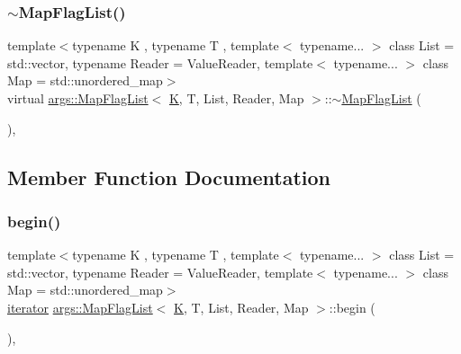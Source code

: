 \mbox{\label{classargs_1_1_map_flag_list_a8799bf86215d5a166efc57e1c8b512e2}} 
\subsubsection{\texorpdfstring{$\sim$\+Map\+Flag\+List()}{~MapFlagList()}}
{\footnotesize\ttfamily template$<$typename K , typename T , template$<$ typename... $>$ class List = std\+::vector, typename Reader  = Value\+Reader, template$<$ typename... $>$ class Map = std\+::unordered\+\_\+map$>$ \\
virtual \hyperlink{classargs_1_1_map_flag_list}{args\+::\+Map\+Flag\+List}$<$ \hyperlink{cgal__test_8cpp_a891e241aa245ae63618f03737efba309}{K}, T, List, Reader, Map $>$\+::$\sim$\hyperlink{classargs_1_1_map_flag_list}{Map\+Flag\+List} (\begin{DoxyParamCaption}{ }\end{DoxyParamCaption})\hspace{0.3cm}{\ttfamily [inline]}, {\ttfamily [virtual]}}



\subsection{Member Function Documentation}
\mbox{\label{classargs_1_1_map_flag_list_a21d879d48f9adf298b1dd824c5cb2e1b}} 
\subsubsection{\texorpdfstring{begin()}{begin()}\hspace{0.1cm}{\footnotesize\ttfamily [1/2]}}
{\footnotesize\ttfamily template$<$typename K , typename T , template$<$ typename... $>$ class List = std\+::vector, typename Reader  = Value\+Reader, template$<$ typename... $>$ class Map = std\+::unordered\+\_\+map$>$ \\
\hyperlink{classargs_1_1_map_flag_list_a73b7f3d1f8e2dc8776c195c9d1b66d34}{iterator} \hyperlink{classargs_1_1_map_flag_list}{args\+::\+Map\+Flag\+List}$<$ \hyperlink{cgal__test_8cpp_a891e241aa245ae63618f03737efba309}{K}, T, List, Reader, Map $>$\+::begin (\begin{DoxyParamCaption}{ }\end{DoxyParamCaption})\hspace{0.3cm}{\ttfamily [inline]}, {\ttfamily [noexcept]}}

